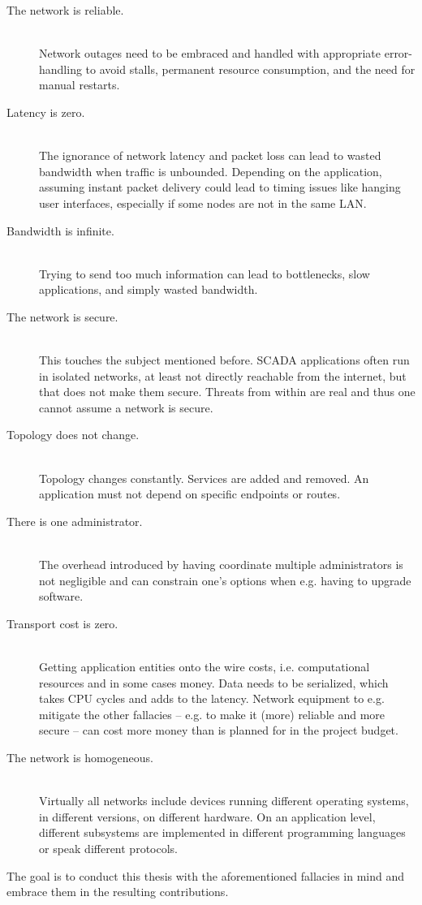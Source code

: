 \begin{description}
	\item [The network is reliable.] \hfill\\
		Network outages need to be embraced and handled with
		appropriate error-handling to avoid stalls, permanent
		resource consumption, and the need for manual restarts.

	\item [Latency is zero.] \hfill\\
		The ignorance of network latency and packet loss can lead to
		wasted bandwidth when traffic is unbounded. Depending on the
		application, assuming instant packet delivery could lead to
		timing issues like hanging user interfaces, especially if some
		nodes are not in the same LAN.

	\item [Bandwidth is infinite.] \hfill\\
		Trying to send too much information can lead to bottlenecks,
		slow applications, and simply wasted bandwidth.

	\item [The network is secure.] \hfill\\
		This touches the subject mentioned before. SCADA applications
		often run in isolated networks, at least not directly reachable
		from the internet, but that does not make them secure. Threats
		from within are real and thus one cannot assume a network is
		secure.

	\item [Topology does not change.] \hfill\\
		Topology changes constantly. Services are added and removed. An
		application must not depend on specific endpoints or routes.

	\item [There is one administrator.] \hfill\\
		The overhead introduced by having coordinate multiple
		administrators is not negligible and can constrain one's options
		when e.g. having to upgrade software.

	\item [Transport cost is zero.] \hfill\\
		Getting application entities onto the wire costs, i.e.
		computational resources and in some cases money. Data needs to
		be serialized, which takes CPU cycles and adds to the latency.
		Network equipment to e.g. mitigate the other fallacies -- e.g.
		to make it (more) reliable and more secure -- can cost more
		money than is planned for in the project budget.

	\item [The network is homogeneous.] \hfill\\
		Virtually all networks include devices running different
		operating systems, in different versions, on different
		hardware. On an application level, different subsystems are
		implemented in different programming languages or speak
		different protocols.

\end{description}

The goal is to conduct this thesis with the aforementioned fallacies in mind and embrace
them in the resulting contributions.
